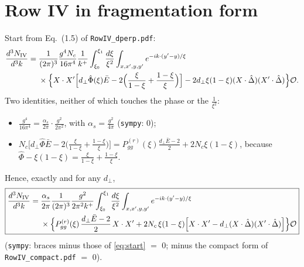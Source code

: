 \documentclass[10pt]{article}
\numberwithin{equation}{section}
\newcommand{\Dh}{\hat\Delta}
\newcommand{\OO}{\mathcal O}
\newcommand{\pre}{\frac{1}{(2\pi)^3}\frac{g^2}{2\pi^2k^+}}
\begin{document}
\section{Row IV in fragmentation form}\label{sec:conv}
Start from Eq.~(1.5) of \texttt{RowIV\_dperp.pdf}:
\begin{align}
\frac{d^3N_{\rm IV}}{d^3k}={}&\frac{1}{(2\pi)^3}\frac{g^4N_c}{16\pi^4}\frac{1}{k^+}\int_{\xi_0}^{\xi_1}\frac{d\xi}{\xi^2}\int_{x,x',y,y'}e^{-ik\cdot(y'-y)/\xi}\notag\\
&\times\Big\{X\cdot X'\Big[d_\perp\hat\Phi(\xi)\bar E-2\Big(\frac{\xi}{1-\xi}+\frac{1-\xi}{\xi}\Big)\Big]-2d_\perp\xi(1-\xi)(X\cdot\Dh)(X'\cdot\Dh)\Big\}\OO .
\label{eq:start}
\end{align}
Two identities, neither of which touches the phase or the $\frac{1}{\xi^2}$:
\begin{itemize}
\item $\frac{g^4}{16\pi^4}=\frac{\alpha_s}{2\pi}\cdot\frac{g^2}{2\pi^2}$, with $\alpha_s=\frac{g^2}{4\pi}$ (\texttt{sympy}: $0$);
\item $N_c\big[d_\perp\hat\Phi\bar E-2\big(\frac{\xi}{1-\xi}+\frac{1-\xi}{\xi}\big)\big]=P^{(r)}_{gg}(\xi)\frac{d_\perp\bar E-2}{2}+2N_c\xi(1-\xi)$, because $\hat\Phi-\xi(1-\xi)=\frac{\xi}{1-\xi}+\frac{1-\xi}{\xi}$.
\end{itemize}
Hence, exactly and for any $d_\perp$,
\begin{equation}
\boxed{\begin{aligned}
\frac{d^3N_{\rm IV}}{d^3k}={}&\frac{\alpha_s}{2\pi}\pre\int_{\xi_0}^{\xi_1}\frac{d\xi}{\xi^2}\int_{x,x',y,y'}e^{-ik\cdot(y'-y)/\xi}\\
&\times\Big\{P^{(r)}_{gg}(\xi)\,\frac{d_\perp\bar E-2}{2}\,X\cdot X'+2N_c\,\xi(1-\xi)\Big[X\cdot X'-d_\perp(X\cdot\Dh)(X'\cdot\Dh)\Big]\Big\}\OO
\end{aligned}}
\label{eq:conv}
\end{equation}
(\texttt{sympy}: braces minus those of \eqref{eq:start} $=$ $0$; minus the compact form of \texttt{RowIV\_compact.pdf} $=$ $0$).
\end{document}
